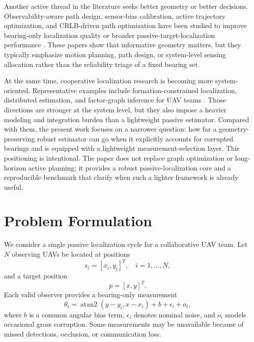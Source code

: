\documentclass[preprint,12pt]{elsarticle}
\begin{document}
Another active thread in the literature seeks better geometry or better decisions. Observability-aware path design, sensor-bias calibration, active trajectory optimization, and CRLB-driven path optimization have been studied to improve bearing-only localization quality or broader passive-target-localization performance \cite{peng2024trajectory,wang2025bio,he2019trajectory,chen2025variable,xing2025node}. These papers show that informative geometry matters, but they typically emphasize motion planning, path design, or system-level sensing allocation rather than the reliability triage of a fixed bearing set.

At the same time, cooperative localization research is becoming more system-oriented. Representative examples include formation-constrained localization, distributed estimation, and factor-graph inference for UAV teams \cite{li2026formation,yang2024distributed}. Those directions are stronger at the system level, but they also impose a heavier modeling and integration burden than a lightweight passive estimator. Compared with them, the present work focuses on a narrower question: how far a geometry-preserving robust estimator can go when it explicitly accounts for corrupted bearings and is equipped with a lightweight measurement-selection layer. This positioning is intentional. The paper does not replace graph optimization or long-horizon active planning; it provides a robust passive-localization core and a reproducible benchmark that clarify when such a lighter framework is already useful.

\section{Problem Formulation}

We consider a single passive localization cycle for a collaborative UAV team. Let $N$ observing UAVs be located at positions
\begin{equation}
s_i = [x_i, y_i]^T, \quad i = 1, \dots, N,
\end{equation}
and a target position
\begin{equation}
p = [x, y]^T.
\end{equation}
Each valid observer provides a bearing-only measurement
\begin{equation}
\theta_i = \operatorname{atan2}(y-y_i, x-x_i) + b + \epsilon_i + o_i,
\end{equation}
where $b$ is a common angular bias term, $\epsilon_i$ denotes nominal noise, and $o_i$ models occasional gross corruption. Some measurements may be unavailable because of missed detections, occlusion, or communication loss.
\end{document}
